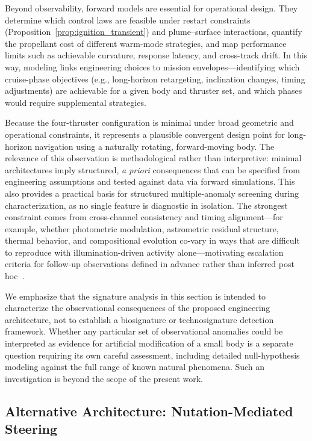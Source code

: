 \documentclass{article}
\begin{document}
Beyond observability, forward models are essential for operational design. They determine which control laws are feasible under restart constraints (Proposition~\ref{prop:ignition_transient}) and plume--surface interactions, quantify the propellant cost of different warm-mode strategies, and map performance limits such as achievable curvature, response latency, and cross-track drift. In this way, modeling links engineering choices to mission envelopes---identifying which cruise-phase objectives (e.g., long-horizon retargeting, inclination changes, timing adjustments) are achievable for a given body and thruster set, and which phases would require supplemental strategies.

Because the four-thruster configuration is minimal under broad geometric and operational constraints, it represents a plausible convergent design point for long-horizon navigation using a naturally rotating, forward-moving body. The relevance of this observation is methodological rather than interpretive: minimal architectures imply structured, \emph{a priori} consequences that can be specified from engineering assumptions and tested against data via forward simulations. This also provides a practical basis for structured multiple-anomaly screening during characterization, as no single feature is diagnostic in isolation. The strongest constraint comes from cross-channel consistency and timing alignment---for example, whether photometric modulation, astrometric residual structure, thermal behavior, and compositional evolution co-vary in ways that are difficult to reproduce with illumination-driven activity alone---motivating escalation criteria for follow-up observations defined in advance rather than inferred post hoc~\cite{eldadi2025}.

We emphasize that the signature analysis in this section is intended to characterize the observational consequences of the proposed engineering architecture, not to establish a biosignature or technosignature detection framework. Whether any particular set of observational anomalies could be interpreted as evidence for artificial modification of a small body is a separate question requiring its own careful assessment, including detailed null-hypothesis modeling against the full range of known natural phenomena. Such an investigation is beyond the scope of the present work.


\subsection{Alternative Architecture: Nutation-Mediated Steering}
\label{sec:nutation_architecture}
\end{document}
